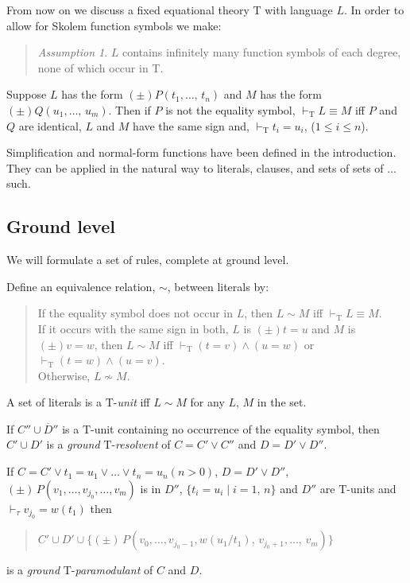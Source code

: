 \documentclass[letterpaper]{report}
\begin{document}
From now on we discuss a fixed equational theory $\mathrm{T}$ with
language $L$. In order to allow for Skolem function symbols we make:
\begin{quote}
\emph{Assumption 1}. $L$ contains infinitely many function symbols of
each degree, none of which occur in $\mathrm{T}$.
\end{quote}

Suppose $L$ has the form $(\pm)P(t_{1}, \ldots,\,t_{n})$ and
$M$ has the form $(\pm)Q(u_{1}, \ldots,\,u_{m})$. Then if $P$
is not the equality symbol, $\vdash_{\mathrm{T}}L \equiv M$ iff
$P$ and $Q$ are identical, $L$ and $M$ have the same sign and,
$\vdash_{\mathrm{T}}t_{i} = u_{i}$,
($1 \leqslant i \leqslant n$).

Simplification and normal-form functions have been defined in the
introduction. They can be applied in the natural way to literals,
clauses, and sets of sets of $\ldots$ such.

\subsection*{Ground level}\label{ground-level}

We will formulate a set of rules, complete at ground level.

Define an equivalence relation, $\sim$, between literals by:
\begin{quote}
If the equality symbol does not occur in $L$, then $L \sim M$ iff
$\vdash_{\mathrm{T}}L \equiv M$.\\
If it occurs with the same sign in both, $L$ is $(\pm)t = u$ and
$M$ is $(\pm)v = w$, then $L \sim M$ iff
$\vdash_{\mathrm{T}}(t = v)\wedge(u = w)$ or
$\vdash_{\mathrm{T}}(t = w)\wedge(u = v)$.\\
Otherwise, $L \nsim M$.
\end{quote}

A set of literals is a $\mathrm{T}$-\emph{unit} iff $L \sim M$ for any $L$,
$M$ in the set.

If $C''\cup\overline{D}''$ is a $\mathrm{T}$-unit
containing no occurrence of the equality symbol, then
$C'\cup D'$ is a \emph{ground} $\mathrm{T}$-\emph{resolvent} of
$C = C'\lor C''$ and
$D = D'\lor D''$.

If
$C = C'\lor t_{1} = u_{1}\vee\ldots\lor t_{n} = u_{n}(n > 0)$,
$D=D'\lor D''$,
$(\pm)\,P(v_{1},\ldots,v_{j_{0}}, \ldots,v_{m})$ is in
$D''$, $\{t_{i} = u_{i}\mid i=1,\,n\}$ and
$D''$ are $\mathrm{T}$-units and
$\vdash_{\tau}v_{j_{0}} = w(t_{1})$ then
\begin{quote}
$C'\cup D'\cup\{(\pm)\,P(v_{0},\ldots,v_{j_{0}-1},w(u_{1}/t_{1}),\,v_{j_{0}+1},\ldots,\,v_{m})\}$
\end{quote}
is a \emph{ground} $\mathrm{T}$-\emph{paramodulant} of $C$ and $D$.
\end{document}
